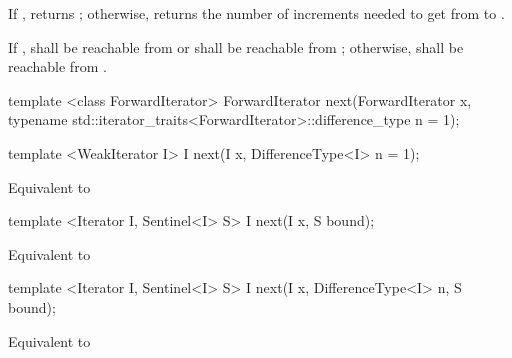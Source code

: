 \begin{itemdescr}
\pnum
\effects
If  ,
returns ; otherwise, returns
the number of increments needed to get from
to
.

\pnum
\requires
If  ,
 shall be reachable from  or  shall be
reachable from ; otherwise,
shall be reachable from
.
\end{itemdescr}

%
\begin{removedblock}
\begin{itemdecl}
template <class ForwardIterator>
  ForwardIterator next(ForwardIterator x,
    typename std::iterator_traits<ForwardIterator>::difference_type n = 1);
\end{itemdecl}
\end{removedblock}
\begin{addedblock}
\begin{itemdecl}
template <WeakIterator I>
  I next(I x, DifferenceType<I> n = 1);
\end{itemdecl}
\end{addedblock}

\begin{itemdescr}
\pnum
\effects Equivalent to 
\end{itemdescr}

\begin{addedblock}
\begin{itemdecl}
template <Iterator I, Sentinel<I> S>
  I next(I x, S bound);
\end{itemdecl}

\begin{itemdescr}
\pnum
\effects Equivalent to 
\end{itemdescr}

\begin{itemdecl}
template <Iterator I, Sentinel<I> S>
  I next(I x, DifferenceType<I> n, S bound);
\end{itemdecl}

\begin{itemdescr}
\pnum
\effects Equivalent to 
\end{itemdescr}
\end{addedblock}

